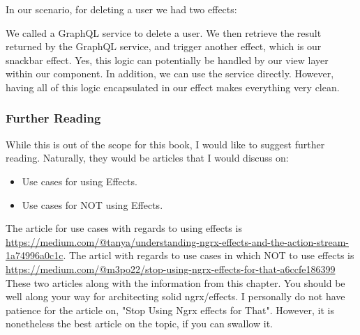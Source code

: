 In our scenario, for deleting a user we had two effects:

We called a GraphQL service to delete a user. We then retrieve the result
returned by the GraphQL service, and trigger another effect, which is our
snackbar effect. Yes, this logic can potentially be handled by our view layer
within our component. In addition, we can use the service directly. However,
having all of this logic encapsulated in our effect makes everything very
clean.

\subsubsection{ Further Reading }
While this is out of the scope for this book, I would like to suggest further
reading. Naturally, they would be articles that I would discuss on:
\begin{itemize}
  \item Use cases for using Effects.
  \item Use cases for NOT using Effects.
\end{itemize}

The article for use cases with regards to using effects is \href{"Understanding NgRx
Effects and the Action Stream"}{https://medium.com/@tanya/understanding-ngrx-effects-and-the-action-stream-1a74996a0c1c}.
The articl with regards to use cases in which NOT to use effects is
\href{Stop using ngrx/effects for that}{https://medium.com/@m3po22/stop-using-ngrx-effects-for-that-a6ccfe186399}
These two articles along with the information from this chapter. You should be
well along your way for architecting solid ngrx/effects. I personally do not
have patience for the article on, "Stop Using Ngrx effects for That". However,
it is nonetheless the best article on the topic, if you can swallow it.
